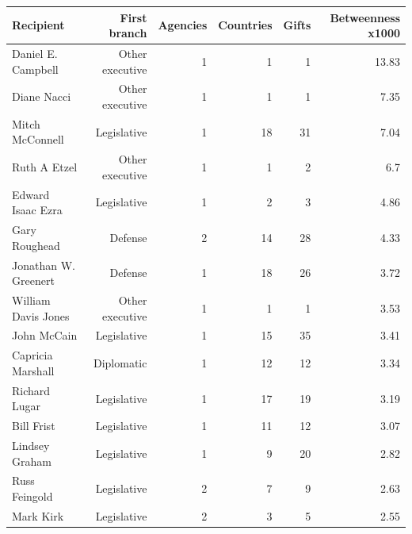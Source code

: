 \begin{tabular}{lrrrrr}
\toprule
Recipient & First branch & Agencies & Countries & Gifts & Betweenness x1000 \\
\midrule
Daniel E. Campbell & Other executive & 1 & 1 & 1 & 13.83 \\
Diane Nacci & Other executive & 1 & 1 & 1 & 7.35 \\
Mitch McConnell & Legislative & 1 & 18 & 31 & 7.04 \\
Ruth A Etzel & Other executive & 1 & 1 & 2 & 6.7 \\
Edward Isaac Ezra & Legislative & 1 & 2 & 3 & 4.86 \\
Gary Roughead & Defense & 2 & 14 & 28 & 4.33 \\
Jonathan W. Greenert & Defense & 1 & 18 & 26 & 3.72 \\
William Davis Jones & Other executive & 1 & 1 & 1 & 3.53 \\
John McCain & Legislative & 1 & 15 & 35 & 3.41 \\
Capricia Marshall & Diplomatic & 1 & 12 & 12 & 3.34 \\
Richard Lugar & Legislative & 1 & 17 & 19 & 3.19 \\
Bill Frist & Legislative & 1 & 11 & 12 & 3.07 \\
Lindsey Graham & Legislative & 1 & 9 & 20 & 2.82 \\
Russ Feingold & Legislative & 2 & 7 & 9 & 2.63 \\
Mark Kirk & Legislative & 2 & 3 & 5 & 2.55 \\
\bottomrule
\end{tabular}
\par{}
